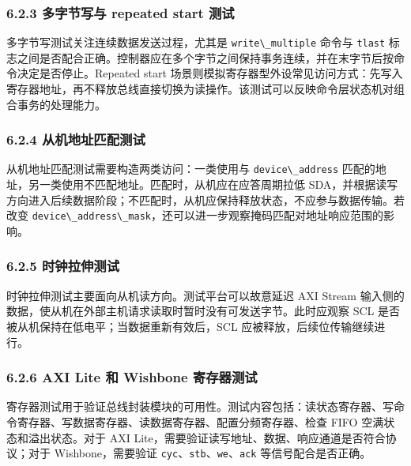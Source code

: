 \subsubsection{6.2.3 多字节写与 repeated start
测试}\label{ux591aux5b57ux8282ux5199ux4e0e-repeated-start-ux6d4bux8bd5}

多字节写测试关注连续数据发送过程，尤其是
\passthrough{\lstinline!write\_multiple!} 命令与
\passthrough{\lstinline!tlast!}
标志之间是否配合正确。控制器应在多个字节之间保持事务连续，并在末字节后按命令决定是否停止。Repeated
start
场景则模拟寄存器型外设常见访问方式：先写入寄存器地址，再不释放总线直接切换为读操作。该测试可以反映命令层状态机对组合事务的处理能力。

\subsubsection{6.2.4
从机地址匹配测试}\label{ux4eceux673aux5730ux5740ux5339ux914dux6d4bux8bd5}

从机地址匹配测试需要构造两类访问：一类使用与
\passthrough{\lstinline!device\_address!}
匹配的地址，另一类使用不匹配地址。匹配时，从机应在应答周期拉低
SDA，并根据读写方向进入后续数据阶段；不匹配时，从机应保持释放状态，不应参与数据传输。若改变
\passthrough{\lstinline!device\_address\_mask!}，还可以进一步观察掩码匹配对地址响应范围的影响。

\subsubsection{6.2.5
时钟拉伸测试}\label{ux65f6ux949fux62c9ux4f38ux6d4bux8bd5}

时钟拉伸测试主要面向从机读方向。测试平台可以故意延迟 AXI Stream
输入侧的数据，使从机在外部主机请求读取时暂时没有可发送字节。此时应观察
SCL 是否被从机保持在低电平；当数据重新有效后，SCL
应被释放，后续位传输继续进行。

\subsubsection{6.2.6 AXI Lite 和 Wishbone
寄存器测试}\label{axi-lite-ux548c-wishbone-ux5bc4ux5b58ux5668ux6d4bux8bd5}

寄存器测试用于验证总线封装模块的可用性。测试内容包括：读状态寄存器、写命令寄存器、写数据寄存器、读数据寄存器、配置分频寄存器、检查
FIFO 空满状态和溢出状态。对于 AXI
Lite，需要验证读写地址、数据、响应通道是否符合协议；对于
Wishbone，需要验证
\passthrough{\lstinline!cyc!}、\passthrough{\lstinline!stb!}、\passthrough{\lstinline!we!}、\passthrough{\lstinline!ack!}
等信号配合是否正确。

